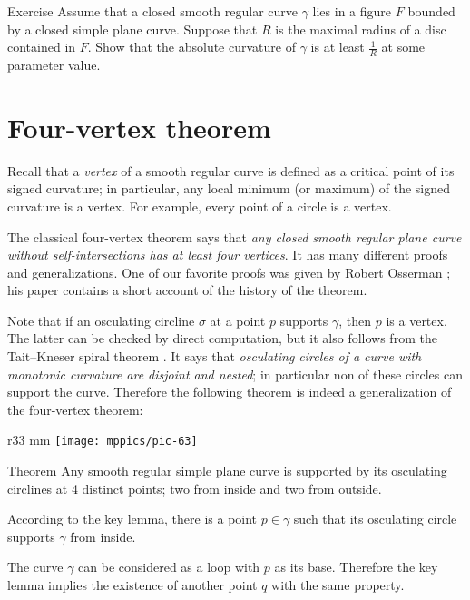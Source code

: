 \documentclass{article}
\begin{document}
\begin{thm}{Exercise}\label{ex:moon-rad}
Assume that a closed smooth regular curve $\gamma$ lies in a figure $F$ bounded by a closed simple plane curve.
Suppose that $R$ is the maximal radius of a disc contained in $F$.
Show that the absolute curvature of $\gamma$ is at least $\tfrac1R$ at some parameter value.
\end{thm}


\section*{Four-vertex theorem}

Recall that a \emph{vertex} of a smooth regular curve is defined as a critical point of its signed curvature;
in particular, any local minimum (or maximum) of the signed curvature is a vertex.
For example, every point of a circle is a vertex.

The classical four-vertex theorem says that \emph{any closed smooth regular plane curve without self-intersections has at least four vertices}.
It has many different proofs and generalizations.
One of our favorite proofs was given by Robert Osserman \cite{osserman}; his paper contains a short account of the history of the theorem.

Note that if an osculating circline $\sigma$ at a point $p$ supports $\gamma$, then $p$ is a vertex.
The latter can be checked by direct computation, but it also follows from the Tait--Kneser spiral theorem \cite{ghys-tabachnikov-timorin}.
It says that \emph{osculating circles of a curve with monotonic curvature are disjoint and nested};
in particular non of these circles can support the curve.
Therefore the following theorem is indeed a generalization of the four-vertex theorem:

{

\begin{wrapfigure}{r}{33 mm}
\vskip-4mm
\centering
\texttt{[image: mppics/pic-63]}
\vskip0mm
\end{wrapfigure}

\begin{thm}{Theorem}\label{thm:4-vert}
Any smooth regular simple plane curve is supported by its osculating circlines at 4 distinct points; two from inside and two from outside.
\end{thm}

According to the key lemma, there is a point $p\in\gamma$ such that its osculating circle supports $\gamma$ from inside.

The curve $\gamma$ can be considered as a loop with $p$ as its base.
Therefore the key lemma implies the existence of another point $q$ with the same property.

}
\end{document}
